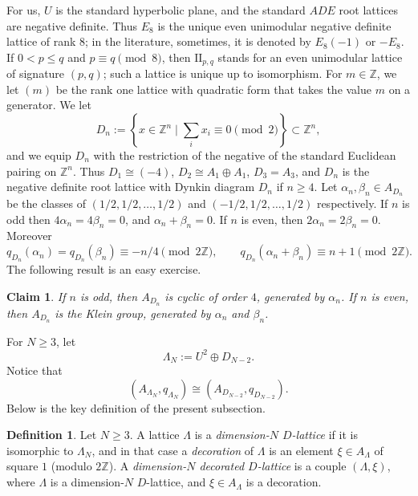 \documentclass[11pt]{amsart}
\numberwithin{equation}{subsection}
\theoremstyle{plain}
\newtheorem{claim}[theorem]{Claim}
\theoremstyle{remark}
\theoremstyle{definition}
\newtheorem{definition}[theorem]{Definition}
\newcommand{\bZ}{\mathbb{Z}}
\newcommand{\II}{\textrm{II}}
\newcommand{\ZZ}{{\mathbb Z}}
\begin{document}
 For us, $U$ is the standard hyperbolic plane, and the standard $ADE$ root lattices are negative definite. Thus $E_8$ is the unique even unimodular negative definite lattice of rank $8$; in the literature, sometimes, it is denoted by $E_8(-1)$ or $-E_8$. If $0<p\le q$ and  $p\equiv q \pmod 8$, then $\II_{p,q}$ stands for an even unimodular lattice of signature $(p,q)$; such a lattice  is unique up to isomorphism. For $m\in\ZZ$, we let $(m)$ be the rank one lattice with quadratic form that takes the value $m$ on a generator. We let 
 \begin{equation}\label{eccodi}
%
 D_{n}:=\left\{x\in\bZ^n\mid \sum_i x_i\equiv 0\pmod 2\right\}\subset \bZ^n,
%
\end{equation}
%
and we equip $D_n$ with the restriction of the negative of the standard Euclidean pairing on $\bZ^n$.  Thus $D_1\cong( -4)$, $D_2\cong A_1\oplus A_1$, $D_3=A_3$, and  $D_n$ is the negative definite root lattice with Dynkin  diagram $D_n$ if $n\ge 4$.
 Let $\alpha_n,\beta_n\in A_{D_n}$ be the classes  of $(1/2,1/2,\ldots,1/2)$ and   $(-1/2,1/2,\ldots,1/2)$  respectively.
If $n$ is odd then  $4\alpha_n=4\beta_n=0$, and $\alpha_n+\beta_n=0$. If $n$ is even, then $2\alpha_n=2\beta_n=0$. Moreover
%
\begin{equation}\label{discdien}
\scriptstyle
%
q_{D_{n}}(\alpha_n)=q_{D_{n}}(\beta_n)\equiv -n/4 \pmod{2\ZZ},\qquad q_{D_{n}}(\alpha_n+\beta_n)\equiv n+1 \pmod{2\ZZ}.
%
\end{equation}
%
The following result is an easy exercise.
%
\begin{claim}\label{clm:disdin}
%
If $n$ is odd, then $A_{D_n}$ is cyclic of order $4$, generated by  $\alpha_n$. If $n$ is even, then  $A_{D_{n}}$ is the Klein group,   generated by $\alpha_n$ and $\beta_n$.
%
\end{claim}
%
For $N\ge 3$, let
%
\begin{equation}
%
\Lambda_N:=U^2\oplus D_{N-2}.
%
\end{equation}
%
Notice that 
%
\begin{equation}\label{rugby}
%
(A_{\Lambda_N},q_{\Lambda_N})\cong (A_{D_{N-2}},q_{D_{N-2}}).
%
\end{equation}
%
Below is the key definition of the present subsection.
%
\begin{definition}\label{dfn:decoro}
%
Let  $N\ge 3$. A  lattice  $\Lambda$ is a  \emph{dimension-$N$ $D$-lattice} if it is  isomorphic to $\Lambda_N$, and in that case a \emph{decoration} of  $\Lambda$  is an element $\xi\in A_{\Lambda}$  of square $1$ (modulo $2\ZZ$). A \emph{dimension-$N$ decorated $D$-lattice} is a couple $(\Lambda,\xi)$, where $\Lambda$ is a 
dimension-$N$ $D$-lattice, and  $\xi\in A_{\Lambda}$ is a decoration. 
%
\end{definition} 
\end{document}
